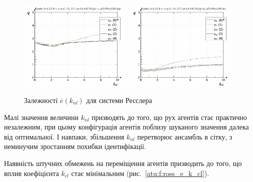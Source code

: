 \begin{figure}[ht!]
\begin{center}
  \includegraphics[width=0.49\textwidth]{p/cha/ross/ross_id-p_k_nl_ql3rlWvnAAW_sign.png}
  \hfill
  \includegraphics[width=0.49\textwidth]{p/cha/ross/ross_id-p_k_nl_ql3rlWvnAAW_sin.png}
\end{center}
\caption{Залежності $ \overline{e} (k_{nl}) $ для системи Ресслера}
\label{atu:f:ross_e_k_nl}
\end{figure}

Малі значення величини
$ k_{nl} $ призводять до того, що рух агентів стає практично
незалежним, при цьому конфігурація агентів поблизу шуканого
значення далека від оптимальної. І навпаки, збільшення
$ k_{nl} $ перетворює ансамбль в сітку, з неминучим зростанням
похибки ідентифікації.

Наявність штучних обмежень на переміщення агентів призводить
до того, що вплив коефіцієнта
$ k_{cl} $ стає мінімальним (рис.~\ref{atu:f:ross_e_k_cl}).

